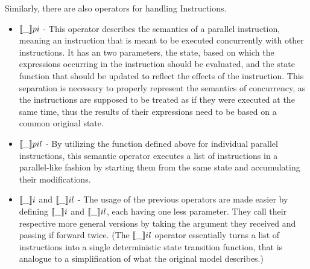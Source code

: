 Similarly, there are also operators for handling Instructions.
\begin{itemize}
    \item $\llbracket \_ \rrbracket pi$ - This operator describes the semantics of a parallel instruction, meaning an instruction that is meant to be executed concurrently with other instructions. It has an two parameters, the state, based on which the expressions occurring in the instruction should be evaluated, and the state function that should be updated to reflect the effects of the instruction. This separation is necessary to properly represent the semantics of concurrency, as the instructions are supposed to be treated as if they were executed at the same time, thus the results of their expressions need to be based on a common original state.
    \begin{code}
        \>[2]\AgdaSpace{}%
        \AgdaSymbol{:}\AgdaSpace{}%
        \AgdaSpace{}%
        \AgdaSpace{}%
        \AgdaSpace{}%
        \AgdaSpace{}%
        \AgdaSpace{}%
        \AgdaSpace{}%
        \<%
    \end{code}
    
    \item $\llbracket \_ \rrbracket pil$ - By utilizing the function defined above for individual parallel instructions, this semantic operator executes a list of instructions in a parallel-like fashion by starting them from the same state and accumulating their modifications.
    \begin{code}
        \>[2]\AgdaSpace{}%
        \AgdaSymbol{:}\AgdaSpace{}%
        \AgdaSpace{}%
        \AgdaSpace{}%
        \AgdaSpace{}%
        \AgdaSpace{}%
        \AgdaSpace{}%
        \AgdaSpace{}%
        \AgdaSpace{}%
        \<%
    \end{code}
    
    \item $\llbracket \_ \rrbracket i$ and $\llbracket \_ \rrbracket il$ - The usage of the previous operators are made easier by defining $\llbracket \_ \rrbracket i$ and $\llbracket \_ \rrbracket il$, each having one less parameter. They call their respective more general versions by taking the argument they received and passing if forward twice.
    (The $\llbracket \_ \rrbracket il$ operator essentially turns a list of instructions into a single deterministic state transition function, that is analogue to a simplification of what the original model describes.)
    

\end{itemize}
